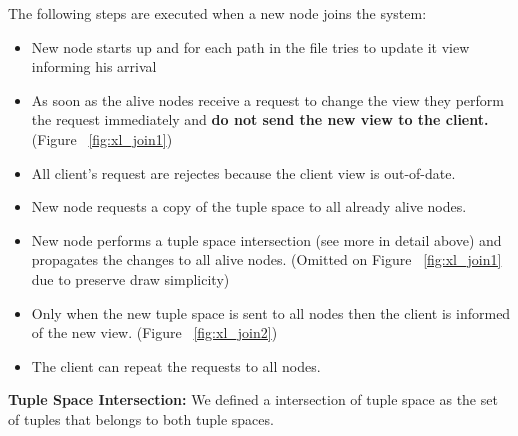 \documentclass[times, 10pt,twocolumn]{article}
\begin{document}



The following steps are executed when a new node joins the system:
\begin{itemize}
   \item New node starts up and for each path in the file tries to update it view informing his arrival
   \item As soon as the alive nodes receive a request to change the view they perform the request
   immediately and \textbf{do not send the new view to the client.} (Figure ~\ref{fig:xl_join1})
   \item All client's request are rejectes because the client view is out-of-date.
   \item New node requests a copy of the tuple space to all already alive nodes.
   \item New node performs a tuple space intersection (see more in detail above) and propagates the changes
   to all alive nodes. (Omitted on Figure ~\ref{fig:xl_join1} due to preserve draw simplicity)
   \item Only when the new tuple space is sent to all nodes then the client is informed of the new view. (Figure ~\ref{fig:xl_join2})
   \item The client can repeat the requests to all nodes.   
\end{itemize}

\textbf{Tuple Space Intersection:} We defined a intersection of tuple space as the set of tuples
that belongs to both tuple spaces.
\end{document}
